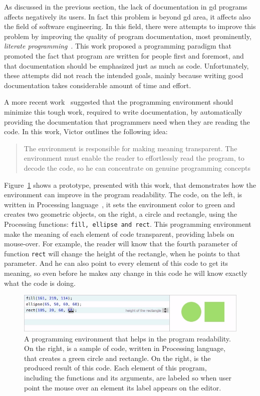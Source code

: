 As discussed in the previous section, the lack of documentation in \gls{gd} programs affects negatively its users. In fact this problem is beyond \gls{gd} area, it affects also the field of software engineering. In this field, there were attempts to improve this problem by improving the quality of program documentation, most prominently, \textit{literate programming}~\citep{knuth1984literate}. This work proposed a programming paradigm that promoted the fact that program are written for people first and foremost, and that documentation should be emphasized just as much as code. Unfortunately, these attempts did not reach the intended goals, mainly because writing good documentation takes considerable amount of time and effort.

A more recent work~\citep{learnableProg} suggested that the programming environment should minimize this tough work, required to write documentation, by automatically providing the documentation that programmers need when they are reading the code. In this work, Victor outlines the following idea:

\blockquote{The environment is responsible for making meaning transparent. The environment must enable the reader to effortlessly read the program, to decode the code, so he can concentrate on genuine programming concepts~\citep{learnableProg}}

Figure~\ref{fig:victor-ex} shows a prototype, presented with this work, that demonstrates how the environment can improve in the program readability. The code, on the left, is written in Processing language~\citep{Reas2006}, it sets the environment color to green and creates two geometric objects, on the right, a circle and rectangle, using the Processing functions: \texttt{fill, ellipse and rect}. This programming environment make the meaning of each element of code transparent, providing labels on mouse-over. For example, the reader will know that the fourth parameter of function \texttt{rect} will change the height of the rectangle, when he points to that parameter. And he can also point to every element of this code to get its meaning, so even before he makes any change in this code he will know exactly what the code is doing.     

\begin{figure}[!h]
  \centering
  \includegraphics[width=.7\textwidth]{images/victor-example}
    \caption{A programming environment that helps in the program readability. On the right, is a sample of code, written in Processing language, that creates a green circle and rectangle. On the right, is the produced result of this code. Each element of this program, including the functions and its arguments, are labeled so when user point the mouse over an element its label appears on the editor.}
  \label{fig:victor-ex}
\end{figure}

